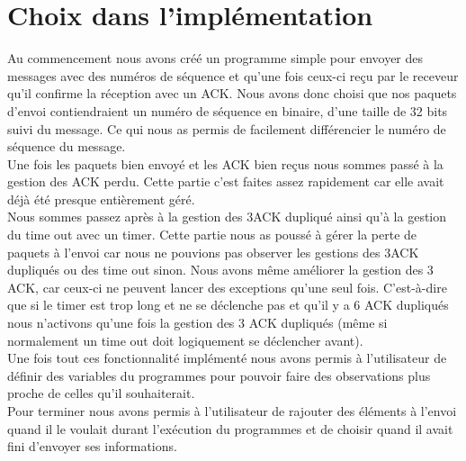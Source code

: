 \documentclass[a4paper,10pt]{article}
\begin{document}
\section{Choix dans l'implémentation}
Au commencement nous avons créé un programme simple pour envoyer des messages avec des numéros de séquence et qu'une fois ceux-ci reçu par le receveur qu'il confirme la réception avec un ACK. Nous avons donc choisi que nos paquets d'envoi contiendraient un numéro de séquence en binaire, d'une taille de 32 bits suivi du message. Ce qui nous as permis de facilement différencier le numéro de séquence du message.\\
Une fois les paquets bien envoyé et les ACK bien reçus nous sommes passé à la gestion des ACK perdu. Cette partie c'est faites assez rapidement car elle avait déjà été presque entièrement géré.\\
Nous sommes passez après à la gestion des 3ACK dupliqué ainsi qu'à la gestion du time out avec un timer. Cette partie nous as poussé à gérer la perte de paquets à l'envoi car nous ne pouvions pas observer les gestions des 3ACK dupliqués ou des time out sinon. Nous avons même améliorer la gestion des 3 ACK, car ceux-ci ne peuvent lancer des exceptions qu'une seul fois. C'est-à-dire que si le timer est trop long et ne se déclenche pas et qu'il y a 6 ACK dupliqués nous n'activons qu'une fois la gestion des 3 ACK dupliqués (même si normalement un time out doit logiquement se déclencher avant).\\
Une fois tout ces fonctionnalité implémenté nous avons permis à l'utilisateur de définir des variables du programmes pour pouvoir faire des observations plus proche de celles qu'il souhaiterait.\\
Pour terminer nous avons permis à l'utilisateur de rajouter des éléments à l'envoi quand il le voulait durant l'exécution du programmes et de choisir quand il avait fini d'envoyer ses informations.\\
\end{document}
